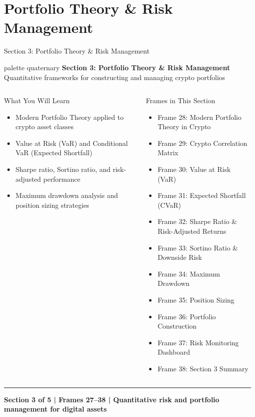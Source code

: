 \documentclass[8pt,aspectratio=169]{beamer}
\newcommand{\bottomnote}[1]{\vfill\vspace{-2mm}\textcolor{mllavender2}{\rule{\textwidth}{0.4pt}}\vspace{1mm}\footnotesize\textbf{#1}}
\begin{document}
\section{Portfolio Theory \& Risk Management}

\begin{frame}{Section 3: Portfolio Theory \& Risk Management}
\begin{beamercolorbox}[sep=12pt,center,rounded=true,shadow=true]{palette quaternary}
  {\Large\bfseries Section 3: Portfolio Theory \& Risk Management}\\[4pt]
  {\normalsize Quantitative frameworks for constructing and managing crypto portfolios}
\end{beamercolorbox}

\vspace{4mm}
\begin{columns}[T]
\begin{block}{What You Will Learn}
\begin{itemize}\setlength{\itemsep}{2pt}
  \item Modern Portfolio Theory applied to crypto asset classes
  \item Value at Risk (VaR) and Conditional VaR (Expected Shortfall)
  \item Sharpe ratio, Sortino ratio, and risk-adjusted performance
  \item Maximum drawdown analysis and position sizing strategies
\end{itemize}
\end{block}
\begin{block}{Frames in This Section}
\begin{itemize}\setlength{\itemsep}{2pt}
  \item Frame 28: Modern Portfolio Theory in Crypto
  \item Frame 29: Crypto Correlation Matrix
  \item Frame 30: Value at Risk (VaR)
  \item Frame 31: Expected Shortfall (CVaR)
  \item Frame 32: Sharpe Ratio \& Risk-Adjusted Returns
  \item Frame 33: Sortino Ratio \& Downside Risk
  \item Frame 34: Maximum Drawdown
  \item Frame 35: Position Sizing
  \item Frame 36: Portfolio Construction
  \item Frame 37: Risk Monitoring Dashboard
  \item Frame 38: Section 3 Summary
\end{itemize}
\end{block}
\end{columns}
\bottomnote{Section 3 of 5 | Frames 27--38 | Quantitative risk and portfolio management for digital assets}
\end{frame}
\end{document}

